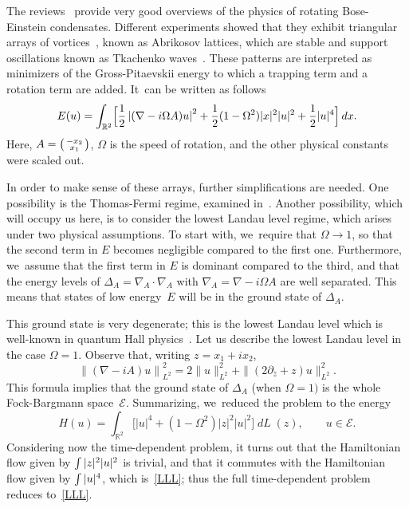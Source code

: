 \documentclass[JEP,XML,SOM,Unicode,NoFloatCountersInSection,published]{cedram}
\newenvironment{smallpmatrix}{\bigl(\begin{smallmatrix}}{\end{smallmatrix}\bigr)}
\DeclareMathOperator{\dL}{\mathit{dL}}
\theoremstyle{definition}
\let\dis\relax
\begin{document}
The reviews~\cite{Aftalion,Fetter} provide very good overviews of the physics of rotating Bose-Einstein condensates.
Different experiments showed that they exhibit triangular arrays of vortices~\cite{ARVK,MCWD,SCEMC}, known as Abrikosov lattices, which are stable and support oscillations known as Tkachenko waves~\cite{BWCB}. These patterns are interpreted as minimizers of the Gross-Pitaevskii energy to which a trapping term and a rotation term are added. It~can be written as follows\vspace*{-1pt}\enlargethispage{3pt}
\[
E(u) = \int_{\mathbb{R}^2} \Bigl[ \frac{1}{2} \left| (\nabla - i \Omega A) u \right|^2 + \frac{1}{2}(1-\Omega^2) |x|^2 |u|^2 + \frac{1}{2} |u|^4 \Bigr] \,dx.
\]
Here, $A = \begin{smallpmatrix} -x_2 \\ x_1 \end{smallpmatrix}$, $\Omega$ is the speed of rotation, and the other physical constants were scaled out.

In order to make sense of these arrays, further simplifications are needed. One possibility is the Thomas-Fermi regime, examined in~\cite{FB}. Another possibility, which will occupy us here, is to consider the lowest Landau level regime, which arises under two physical assumptions. To start with, we~require that $\Omega \to 1$, so that the second term in $E$ becomes negligible compared to the first one. Furthermore, we~assume that the first term in $E$ is dominant compared to the third, and that the energy levels of $\Delta_A = \nabla_A \cdot \nabla_A$ with $\nabla_A=\nabla -i \Omega A$ are well separated. This means that states of low energy~$E$ will be in the ground state of $\Delta_A$.

This ground state is very degenerate; this is the lowest Landau level which is well-known in quantum Hall physics~\cite{GJ,PericeThese}. Let us describe the lowest Landau level in the case $\Omega = 1$. Observe that, writing $z=x_1+ix_2$,\vspace*{-3pt}
\[
\left\| (\nabla - i A) u \right\|^2_{L^2} = 2 \| u \|_{L^2}^2 + \| (2 \partial_{\overline{z}} + z) u \|_{L^2}^2.
\]
This formula implies that the ground state of $\Delta_A$ (when $\Omega=1)$ is the whole Fock-Bargmann space~$\mathcal{E}$. Summarizing, we~reduced the problem to the energy\vspace*{-3pt}
\[
H(u) = \int_{\mathbb{R}^2} \Big[ |u|^4 + (1-\Omega^2) |z|^2|u|^2 \Big]\dL(z), \qquad u \in \mathcal{E}.
\]
Considering now the time-dependent problem, it turns out that the Hamiltonian flow given by $\dis \int |z|^2|u|^2$ is trivial, and that it commutes with the Hamiltonian flow given by $\dis \int |u|^4$, which is~\eqref{LLL}; thus the full time-dependent problem reduces to~\eqref{LLL}.
\end{document}
